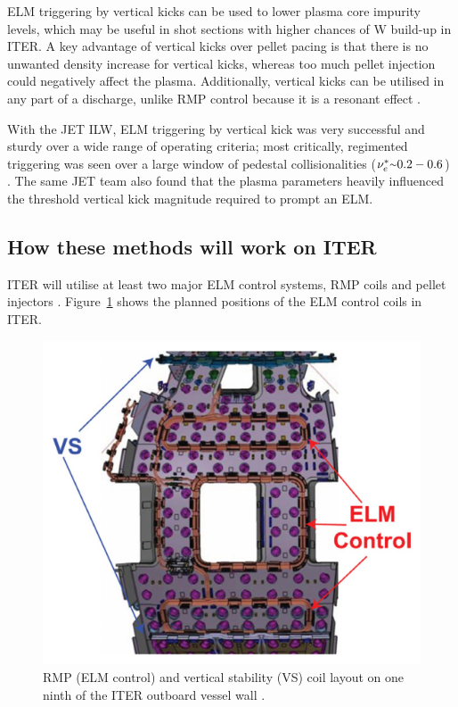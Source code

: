 \documentclass[11pt, twocolumn]{article}  %
\providecommand{\squiggle}{\raise.17ex\hbox{$\scriptstyle\sim$}} %
\begin{document}
ELM triggering by vertical kicks can be used to lower plasma core impurity levels, which may be useful in shot sections with higher chances of W build-up in ITER. A key advantage of vertical kicks over pellet pacing is that there is no unwanted density increase for vertical kicks, whereas too much pellet injection could negatively affect the plasma. Additionally, vertical kicks can be utilised in any part of a discharge, unlike RMP control because it is a resonant effect \cite{DelaLuna2016}.

With the JET ILW, ELM triggering by vertical kick was very successful and sturdy over a wide range of operating criteria; most critically, regimented triggering was seen over a large window of pedestal collisionalities ($\nu^*_e \squiggle 0.2-0.6$) \cite{DelaLuna2016}. The same JET team also found that the plasma parameters heavily influenced the threshold vertical kick magnitude required to prompt an ELM. 

\subsection{How these methods will work on ITER}\label{ssec:onITER}
ITER will utilise at least two major ELM control systems, RMP coils and pellet injectors \cite{Loarte2010}. Figure~\ref{fig:ITERcoils} shows the planned positions of the ELM control coils in ITER.

\begin{figure}
\includegraphics[scale=0.5]{Figures/ITERcoils.PNG}
\centering
\caption{RMP (ELM control) and vertical stability (VS) coil layout on one ninth of the ITER outboard vessel wall \cite{Lang2013}.}\label{fig:ITERcoils}
\end{figure}
\end{document}
